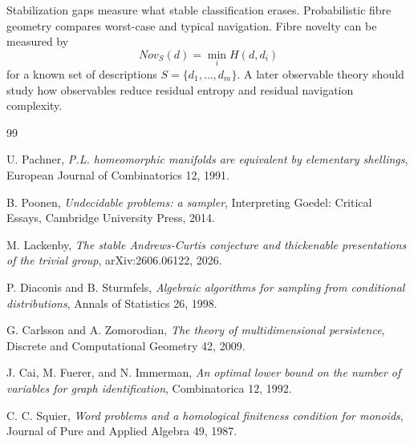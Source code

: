 \documentclass[11pt]{article}
\begin{document}
Stabilization gaps measure what stable classification erases.  Probabilistic fibre geometry compares worst-case and typical navigation.  Fibre novelty can be measured by
\[
Nov_S(d)=\min_i H(d,d_i)
\]
for a known set of descriptions \(S=\{d_1,\ldots,d_m\}\).  A later observable theory should study how observables reduce residual entropy and residual navigation complexity.

\begin{thebibliography}{99}

U. Pachner,
\emph{P.L. homeomorphic manifolds are equivalent by elementary shellings},
European Journal of Combinatorics 12, 1991.

B. Poonen,
\emph{Undecidable problems: a sampler},
Interpreting Goedel: Critical Essays, Cambridge University Press, 2014.

M. Lackenby,
\emph{The stable Andrews-Curtis conjecture and thickenable presentations of the trivial group},
arXiv:2606.06122, 2026.

P. Diaconis and B. Sturmfels,
\emph{Algebraic algorithms for sampling from conditional distributions},
Annals of Statistics 26, 1998.

G. Carlsson and A. Zomorodian,
\emph{The theory of multidimensional persistence},
Discrete and Computational Geometry 42, 2009.

J. Cai, M. Fuerer, and N. Immerman,
\emph{An optimal lower bound on the number of variables for graph identification},
Combinatorica 12, 1992.

C. C. Squier,
\emph{Word problems and a homological finiteness condition for monoids},
Journal of Pure and Applied Algebra 49, 1987.

\end{thebibliography}
\end{document}
